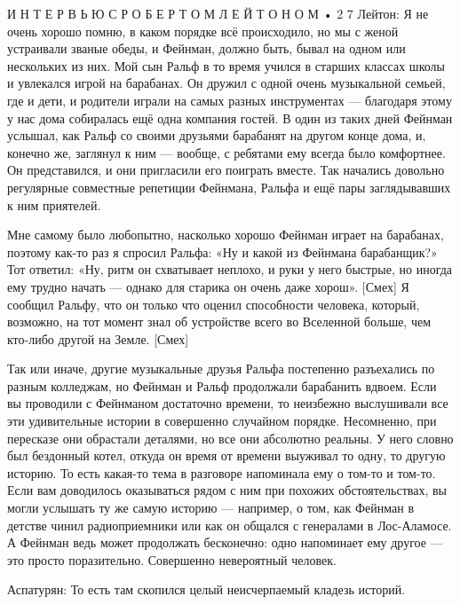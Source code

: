 \documentclass[11pt,oneside]{article}
\begin{document}
И Н Т Е Р В Ь Ю   С   Р О Б Е Р Т О М   Л Е Й Т О Н О М • 2 7 Лейтон: Я не очень хорошо помню, в каком порядке всё происходило, но мы с женой устраивали званые обеды, и Фейнман, должно быть, бывал на одном или нескольких из них. Мой сын Ральф в то время учился в старших классах школы и увлекался игрой на барабанах. Он дружил с одной очень музыкальной семьей, где и дети, и родители играли на самых разных инструментах --- благодаря этому у нас дома собиралась ещё одна компания гостей. В один из таких дней Фейнман услышал, как Ральф со своими друзьями барабанят на другом конце дома, и, конечно же, заглянул к ним --- вообще, с ребятами ему всегда было комфортнее. Он представился, и они пригласили его поиграть вместе. Так начались довольно регулярные совместные репетиции Фейнмана, Ральфа и ещё пары заглядывавших к ним приятелей.\par



Мне самому было любопытно, насколько хорошо Фейнман играет на барабанах, поэтому как-то раз я спросил Ральфа: «Ну и какой из Фейнмана барабанщик?» Тот ответил: «Ну, ритм он схватывает неплохо, и руки у него быстрые, но иногда ему трудно начать --- однако для старика он очень даже хорош». [Смех] Я сообщил Ральфу, что он только что оценил способности человека, который, возможно, на тот момент знал об устройстве всего во Вселенной больше, чем кто-либо другой на Земле. [Смех]\par



Так или иначе, другие музыкальные друзья Ральфа постепенно разъехались по разным колледжам, но Фейнман и Ральф продолжали барабанить вдвоем. Если вы проводили с Фейнманом достаточно времени, то неизбежно выслушивали все эти удивительные истории в совершенно случайном порядке. Несомненно, при пересказе они обрастали деталями, но все они абсолютно реальны. У него словно был бездонный котел, откуда он время от времени выуживал то одну, то другую историю. То есть какая-то тема в разговоре напоминала ему о том-то и том-то. Если вам доводилось оказываться рядом с ним при похожих обстоятельствах, вы могли услышать ту же самую историю --- например, о том, как Фейнман в детстве чинил радиоприемники или как он общался с генералами в Лос-Аламосе. А Фейнман ведь может продолжать бесконечно: одно напоминает ему другое --- это просто поразительно. Совершенно невероятный человек.\par



Аспатурян: То есть там скопился целый неисчерпаемый кладезь историй.\par
\end{document}
